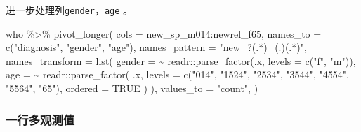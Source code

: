 \documentclass[
]{book}
\newenvironment{Shaded}{\begin{snugshade}}{\end{snugshade}}
\newcommand{\AttributeTok}[1]{\textcolor[rgb]{0.77,0.63,0.00}{#1}}
\newcommand{\ConstantTok}[1]{\textcolor[rgb]{0.00,0.00,0.00}{#1}}
\newcommand{\FunctionTok}[1]{\textcolor[rgb]{0.00,0.00,0.00}{#1}}
\newcommand{\NormalTok}[1]{#1}
\newcommand{\SpecialCharTok}[1]{\textcolor[rgb]{0.00,0.00,0.00}{#1}}
\newcommand{\StringTok}[1]{\textcolor[rgb]{0.31,0.60,0.02}{#1}}
\begin{document}
进一步处理列\texttt{gender}，\texttt{age} 。

\begin{Shaded}
\begin{Highlighting}[]
\NormalTok{who }\SpecialCharTok{\%\textgreater{}\%} \FunctionTok{pivot\_longer}\NormalTok{(}
  \AttributeTok{cols =}\NormalTok{ new\_sp\_m014}\SpecialCharTok{:}\NormalTok{newrel\_f65,}
  \AttributeTok{names\_to =} \FunctionTok{c}\NormalTok{(}\StringTok{"diagnosis"}\NormalTok{, }\StringTok{"gender"}\NormalTok{, }\StringTok{"age"}\NormalTok{), }
  \AttributeTok{names\_pattern =} \StringTok{"new\_?(.*)\_(.)(.*)"}\NormalTok{,}
  \AttributeTok{names\_transform =} \FunctionTok{list}\NormalTok{(}
    \AttributeTok{gender =} \SpecialCharTok{\textasciitilde{}}\NormalTok{ readr}\SpecialCharTok{::}\FunctionTok{parse\_factor}\NormalTok{(.x, }\AttributeTok{levels =} \FunctionTok{c}\NormalTok{(}\StringTok{"f"}\NormalTok{, }\StringTok{"m"}\NormalTok{)),}
    \AttributeTok{age =} \SpecialCharTok{\textasciitilde{}}\NormalTok{ readr}\SpecialCharTok{::}\FunctionTok{parse\_factor}\NormalTok{(}
\NormalTok{      .x,}
      \AttributeTok{levels =} \FunctionTok{c}\NormalTok{(}\StringTok{"014"}\NormalTok{, }\StringTok{"1524"}\NormalTok{, }\StringTok{"2534"}\NormalTok{, }\StringTok{"3544"}\NormalTok{, }\StringTok{"4554"}\NormalTok{, }\StringTok{"5564"}\NormalTok{, }\StringTok{"65"}\NormalTok{), }
      \AttributeTok{ordered =} \ConstantTok{TRUE}
\NormalTok{    )}
\NormalTok{  ),}
  \AttributeTok{values\_to =} \StringTok{"count"}\NormalTok{,}
\NormalTok{)}
\end{Highlighting}
\end{Shaded}

\hypertarget{ux4e00ux884cux591aux89c2ux6d4bux503c}{%
\subsubsection{一行多观测值}\label{ux4e00ux884cux591aux89c2ux6d4bux503c}}
\end{document}
